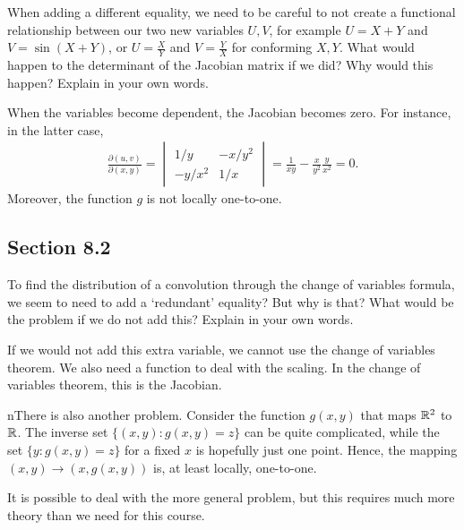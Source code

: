\begin{exercise}
When adding a different equality, we need to be careful to not create a functional relationship between our two new variables $U,V$, for example $U=X+Y$ and $V=\sin(X+Y)$, or $U=\frac X Y$ and $V = \frac Y X$ for conforming $X,Y$.
What would happen to the determinant of the Jacobian matrix if we did?
Why would this happen?
Explain in your own words.
\begin{solution}
  When the variables become dependent, the Jacobian becomes zero. For instance,  in the latter case,
\begin{align}
\frac{\partial (u,v)}{\partial (x, y)} =
  \begin{vmatrix}
    1/y & -x/y^{2} \\
-y/x^{2} & 1/x
  \end{vmatrix} = \frac{1}{x y} - \frac{x}{y^2}\frac{y}{x^{2}} = 0.
\end{align}
Moreover, the function $g$ is not locally one-to-one.

\end{solution}
\end{exercise}


\subsection*{Section 8.2}
\label{sec:section-8.2}


\begin{exercise}
To find the distribution of a convolution through the change of variables formula, we seem to need to add a `redundant' equality?
But why is that?
What would be the problem if we do not add this?
Explain in your own words.
\begin{solution}
If we would not add this extra variable, we cannot use the change of variables theorem. We also need a function to deal with the scaling. In the change of variables theorem, this is the Jacobian.

nThere is also another problem.
Consider the function $g(x, y)$ that maps $\mathbb{R}^{2}$ to $\mathbb{R}$.
The inverse set $\{ (x,y) : g(x,y) =z \}$ can be quite complicated, while the set $\{y : g(x, y) = z\}$ for a fixed $x$ is hopefully just one point.
Hence, the mapping $(x, y) \to (x, g(x,y))$ is, at least locally, one-to-one.

It is possible to deal with the more general problem, but this requires much more theory than we need for this course.
\end{solution}
\end{exercise}


